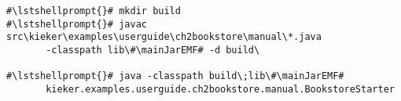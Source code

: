 \begin{lstlisting}[caption=Commands to compile and run the instrumented Bookstore under Windows,label=lst:bookstoreStarterWin]
#\lstshellprompt{}# mkdir build
#\lstshellprompt{}# javac src\kieker\examples\userguide\ch2bookstore\manual\*.java  
       -classpath lib\#\mainJarEMF# -d build\

#\lstshellprompt{}# java -classpath build\;lib\#\mainJarEMF#
       kieker.examples.userguide.ch2bookstore.manual.BookstoreStarter
\end{lstlisting}